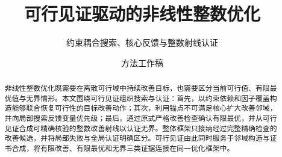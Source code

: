 \documentclass[a4paper,UKenglish,cleveref,autoref,thm-restate]{lipics-v2021}
\title{可行见证驱动的非线性整数优化}
\subtitle{约束耦合搜索、核心反馈与整数射线认证}
\author{方法工作稿}{内部研究讨论，非投稿版本}{}{}{}
\begin{document}
\maketitle

\begin{abstract}
非线性整数优化既需要在离散可行域中持续改善目标，也需要区分当前可行值、有限最优值与无界情形。本文围绕可行见证组织搜索与认证：首先，以约束依赖和因子覆盖构造能够联合恢复可行性的目标改善动作；其次，利用锚点不可满足核心扩大改善邻域，并向局部搜索反馈变量优先级；最后，通过原式严格改善检查确认有限最优，并从可行见证合成可精确核验的整数改善射线以认证无界。整体框架只接纳经过完整精确检查的改善候选，并将局部失败与全局认证明确区分。可行见证由此同时服务于邻域构造与证书合成，将有限改善、有限最优和无界三类证据连接在同一优化框架中。
\end{abstract}


\FloatBarrier

\FloatBarrier

\FloatBarrier

\end{document}
